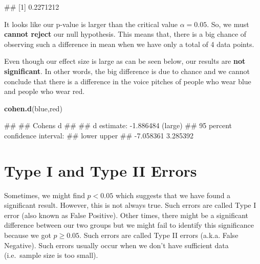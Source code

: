 \documentclass[
]{book}
\newenvironment{Shaded}{\begin{snugshade}}{\end{snugshade}}
\newcommand{\FunctionTok}[1]{\textcolor[rgb]{0.13,0.29,0.53}{\textbf{#1}}}
\newcommand{\NormalTok}[1]{#1}
\begin{document}
\begin{Shaded}
\begin{Highlighting}[]
\NormalTok{\#\# [1] 0.2271212}
\end{Highlighting}
\end{Shaded}

It looks like our p-value is larger than the critical value \(\alpha = 0.05\). So, we must \textbf{cannot reject} our null hypothesis. This means that, there is a big chance of observing such a difference in mean when we have only a total of 4 data points.

Even though our effect size is large as can be seen below, our results are \textbf{not significant}. In other words, the big difference is due to chance and we cannot conclude that there is a difference in the voice pitches of people who wear blue and people who wear red.

\begin{Shaded}
\begin{Highlighting}[]
\FunctionTok{cohen.d}\NormalTok{(blue,red)}
\end{Highlighting}
\end{Shaded}

\begin{Shaded}
\begin{Highlighting}[]
\NormalTok{\#\# }
\NormalTok{\#\# Cohen\textquotesingle{}s d}
\NormalTok{\#\# }
\NormalTok{\#\# d estimate: {-}1.886484 (large)}
\NormalTok{\#\# 95 percent confidence interval:}
\NormalTok{\#\#     lower     upper }
\NormalTok{\#\# {-}7.058361  3.285392}
\end{Highlighting}
\end{Shaded}

\section{Type I and Type II Errors}\label{type-i-and-type-ii-errors}

Sometimes, we might find \(p < 0.05\) which suggests that we have found a significant result. However, this is not always true. Such errors are called Type I error (also known as False Positive). Other times, there might be a significant difference between our two groups but we might fail to identify this significance because we got \(p \geq 0.05\). Such errors are called Type II errors (a.k.a. False Negative). Such errors usually occur when we don't have sufficient data (i.e.~sample size is too small).
\end{document}
